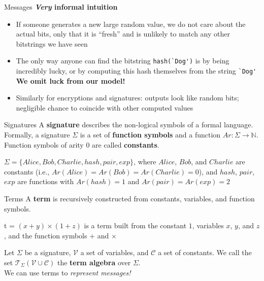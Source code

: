 \documentclass[11pt,aspectratio=169]{beamer}
\begin{document}
\begin{frame}[fragile]{Messages}
    \textbf{\textit{Very} informal intuition}
    \begin{itemize}
        \item If someone generates a new large random value, we do not care 
              about the actual bits, only that it is ``fresh'' and is unlikely 
              to match any other bitstrings we have seen
        \item The only way anyone can find the bitstring \verb|hash(`Dog')| is 
              by being incredibly lucky, or by computing this hash themselves 
              from the string \verb|`Dog'|
              \textbf{We omit luck from our model!}
        \item Similarly for encryptions and signatures: outputs look like 
              random bits; negligible chance to coincide with other computed 
              values
    \end{itemize}
\end{frame}

\begin{frame}[fragile]{Signatures}
    A \textbf{signature} describes the non-logical symbols of a formal language.
    \\[.3cm]
    Formally, a signature $\Sigma$ is a set of \textbf{function symbols} and a 
    function $Ar: \Sigma \rightarrow \mathbb{N}$. Function symbols of arity 0 
    are called \textbf{constants}.

    \begin{tcolorbox}[title=Example]
        $\Sigma = \{Alice, Bob, Charlie, hash, pair, exp\}$, where $Alice$, 
        $Bob$, and $Charlie$ are constants (i.e., $Ar(Alice) = Ar(Bob) = Ar
        (Charlie) = 0$), and $hash$, $pair$, $exp$ are functions with
        $Ar(hash) = 1$ and $Ar(pair) = Ar(exp) = 2$
    \end{tcolorbox}
\end{frame}

\begin{frame}[fragile]{Terms}
    A \textbf{term} is recursively constructed from constants, variables, and 
    function symbols.

    \begin{tcolorbox}[title=Example]
        t = $(x + y) \times (1 + z)$ is a term built from the constant $1$, 
        variables $x$, $y$, and $z$, and the function symbols $+$ and $\times$
    \end{tcolorbox}

    Let $\Sigma$ be a signature, $\mathcal{V}$ a set of variables,  and 
    $\mathcal{C}$ a set of constants. We call the set $\mathcal{T}_{\Sigma}
    (\mathcal{V} \cup \mathcal{C})$ the \textbf{term algebra} over $\Sigma$.
    \\[.3cm]
    We can use terms to \textit{represent messages!}
\end{frame}
\end{document}
